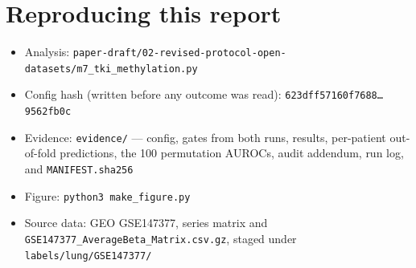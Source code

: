 \documentclass[11pt,a4paper]{article}
\begin{document}
\section{Reproducing this report}

\begin{itemize}[leftmargin=1.2em,itemsep=1pt]
\item Analysis: \texttt{paper-draft/02-revised-protocol-open-datasets/m7\_tki\_methylation.py}
\item Config hash (written before any outcome was read):
      \texttt{623dff57160f7688\ldots9562fb0c}
\item Evidence: \texttt{evidence/} --- config, gates from both runs, results, per-patient
      out-of-fold predictions, the 100 permutation AUROCs, audit addendum, run log, and
      \texttt{MANIFEST.sha256}
\item Figure: \texttt{python3 make\_figure.py}
\item Source data: GEO GSE147377, series matrix and
      \texttt{GSE147377\_AverageBeta\_Matrix.csv.gz}, staged under
      \texttt{labels/lung/GSE147377/}
\end{itemize}
\end{document}
